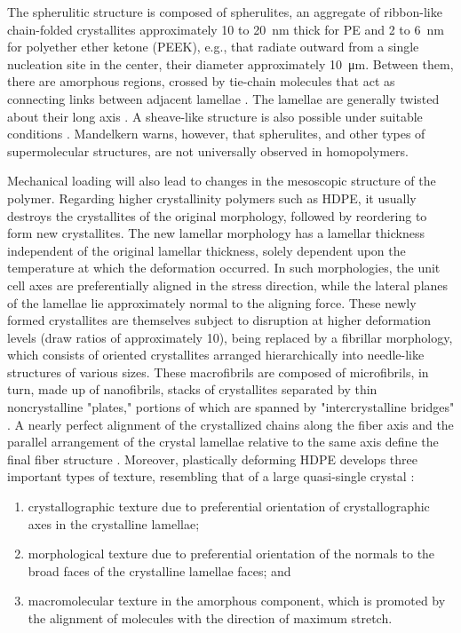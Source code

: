 The spherulitic structure is composed of spherulites, an aggregate of ribbon-like chain-folded crystallites approximately 10 to \SI{20}{\nano\meter} thick for PE and 2 to \SI{6}{\nano\meter} for polyether ether ketone (PEEK), e.g., that radiate outward from a single nucleation site in the center, their diameter approximately \SI{10}{\micro\meter}.
Between them, there are amorphous regions, crossed by tie-chain molecules that act as connecting links between adjacent lamellae \citep{callister2014materials, khouryMorphologyCrystallineSynthetic1976, pouriayevaliConstitutiveDescriptionRatesensitive2013, gsellEvolutionMicrostructureSemicrystalline1994}.
The lamellae are generally twisted about their long axis \citep{patlazhanStructuralMechanicsSemicrystalline2012}.
A sheave-like structure is also possible under suitable conditions \citep{peacockHandbookPolyethyleneStructures2014}.
Mandelkern \citep{mandelkernCrystallinePolymerReminiscences2006} warns, however, that spherulites, and other types of supermolecular structures, are not universally observed in homopolymers.

Mechanical loading will also lead to changes in the mesoscopic structure of the polymer.
Regarding higher crystallinity polymers such as HDPE, it usually destroys the crystallites of the original morphology, followed by reordering to form new crystallites.
The new lamellar morphology has a lamellar thickness independent of the original lamellar thickness, solely dependent upon the temperature at which the deformation occurred.
In such morphologies, the unit cell axes are preferentially aligned in the stress direction, while the lateral planes of the lamellae lie approximately normal to the aligning force.
These newly formed crystallites are themselves subject to disruption at higher deformation levels (draw ratios of approximately 10), being replaced by a fibrillar morphology, which consists of oriented crystallites arranged hierarchically into needle-like structures of various sizes.
These macrofibrils are composed of microfibrils, in turn, made up of nanofibrils, stacks of crystallites separated by thin noncrystalline "plates," portions of which are spanned by "intercrystalline bridges" \citep{peacockHandbookPolyethyleneStructures2014}.
A nearly perfect alignment of the crystallized chains along the fiber axis and the parallel arrangement of the crystal lamellae relative to the same axis define the final fiber structure \citep{peterlinMolecularModelDrawing1971}.
Moreover, plastically deforming HDPE develops three important types of texture, resembling that of a large quasi-single crystal \citep{argonPhysicsDeformationFracture2013a}:
\begin{enumerate}
	\item crystallographic texture due to preferential orientation of crystallographic axes in the crystalline lamellae;
	\item morphological texture due to preferential orientation of the normals to the broad faces of the crystalline lamellae faces; and
	\item macromolecular texture in the amorphous component, which is promoted by the alignment of molecules with the direction of maximum stretch.
\end{enumerate}

